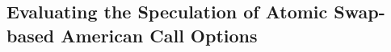 \subsection{Evaluating the Speculation of Atomic Swap-based American Call Options}
\label{sec:evaluation}